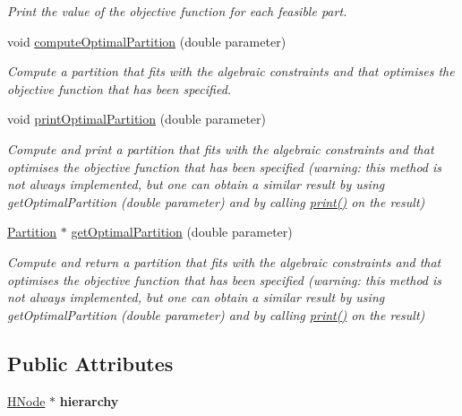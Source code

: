 \begin{DoxyCompactItemize}
\begin{DoxyCompactList}\small\item\em Print the value of the objective function for each feasible part. \end{DoxyCompactList}\item 
void \hyperlink{classHierarchicalSet_a98c856781a0b5e1a7d4727f0078c6838}{compute\-Optimal\-Partition} (double parameter)
\begin{DoxyCompactList}\small\item\em Compute a partition that fits with the algebraic constraints and that optimises the objective function that has been specified. \end{DoxyCompactList}\item 
void \hyperlink{classHierarchicalSet_a5cc9af69f6cf68fbfac2343207d125b5}{print\-Optimal\-Partition} (double parameter)
\begin{DoxyCompactList}\small\item\em Compute and print a partition that fits with the algebraic constraints and that optimises the objective function that has been specified (warning\-: this method is not always implemented, but one can obtain a similar result by using get\-Optimal\-Partition (double parameter) and by calling \hyperlink{classHierarchicalSet_a6692536203bfd050a44e9abef2193564}{print()} on the result) \end{DoxyCompactList}\item 
\hyperlink{classPartition}{Partition} $\ast$ \hyperlink{classHierarchicalSet_a1f7b6ed6c57f17fcdee7c7c2bfbe4925}{get\-Optimal\-Partition} (double parameter)
\begin{DoxyCompactList}\small\item\em Compute and return a partition that fits with the algebraic constraints and that optimises the objective function that has been specified (warning\-: this method is not always implemented, but one can obtain a similar result by using get\-Optimal\-Partition (double parameter) and by calling \hyperlink{classHierarchicalSet_a6692536203bfd050a44e9abef2193564}{print()} on the result) \end{DoxyCompactList}\end{DoxyCompactItemize}
\subsection*{Public Attributes}
\begin{DoxyCompactItemize}
\item 
\hypertarget{classHierarchicalSet_ab2b74de5c35a9cb3067ebe3f40c10d93}{\hyperlink{classHNode}{H\-Node} $\ast$ {\bfseries hierarchy}}\label{classHierarchicalSet_ab2b74de5c35a9cb3067ebe3f40c10d93}

\end{DoxyCompactItemize}


